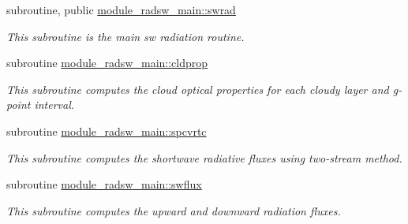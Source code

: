 {\bf }\par
\begin{DoxyCompactItemize}
\item 
subroutine, public \hyperlink{namespacemodule__radsw__main_ad9b28f997232642658b4d15a7eb70fcd}{module\+\_\+radsw\+\_\+main\+::swrad}                                                                                                 
\begin{DoxyCompactList}\small\item\em This subroutine is the main sw radiation routine. \end{DoxyCompactList}\end{DoxyCompactItemize}

{\bf }\par
\begin{DoxyCompactItemize}
\item 
subroutine \hyperlink{namespacemodule__radsw__main_ae9779a4f9bc2ddc9d856c844639c9bd3}{module\+\_\+radsw\+\_\+main\+::cldprop}                                                                                             
\begin{DoxyCompactList}\small\item\em This subroutine computes the cloud optical properties for each cloudy layer and g-\/point interval. \end{DoxyCompactList}\end{DoxyCompactItemize}

{\bf }\par
\begin{DoxyCompactItemize}
\item 
subroutine \hyperlink{namespacemodule__radsw__main_aa104d257f11aa7e84692c08b3716af66}{module\+\_\+radsw\+\_\+main\+::spcvrtc}                                                                                             
\begin{DoxyCompactList}\small\item\em This subroutine computes the shortwave radiative fluxes using two-\/stream method. \end{DoxyCompactList}\end{DoxyCompactItemize}

{\bf }\par
\begin{DoxyCompactItemize}
\item 
subroutine \hyperlink{namespacemodule__radsw__main_a138ee8c91089737c432cf70dbd8a8fae}{module\+\_\+radsw\+\_\+main\+::swflux}                                                                                               
\begin{DoxyCompactList}\small\item\em This subroutine computes the upward and downward radiation fluxes. \end{DoxyCompactList}\end{DoxyCompactItemize}

